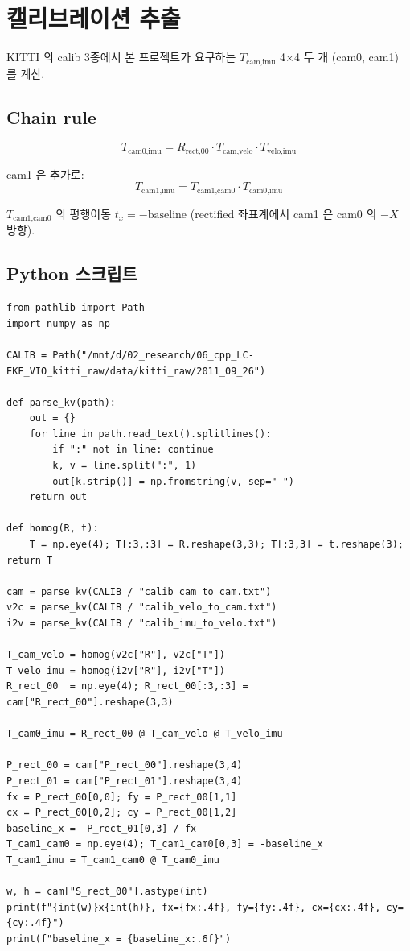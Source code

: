 \documentclass[11pt,a4paper,oneside]{report}
\begin{document}
\section{캘리브레이션 추출}

KITTI 의 calib 3종에서 본 프로젝트가 요구하는 \(T_{\text{cam,imu}}\) 4$\times$4 두 개 (cam0, cam1) 를 계산.

\subsection{Chain rule}
\begin{equation}
T_{\text{cam0,imu}} = R_{\text{rect,00}} \cdot T_{\text{cam,velo}} \cdot T_{\text{velo,imu}}
\end{equation}

cam1 은 추가로:
\begin{equation}
T_{\text{cam1,imu}} = T_{\text{cam1,cam0}} \cdot T_{\text{cam0,imu}}
\end{equation}

\(T_{\text{cam1,cam0}}\) 의 평행이동 \(t_x = -\text{baseline}\) (rectified 좌표계에서 cam1 은 cam0 의 \(-X\) 방향).

\subsection{Python 스크립트}

\begin{lstlisting}[style=py,caption={임시 파일로 저장 후 1회 실행}]
from pathlib import Path
import numpy as np

CALIB = Path("/mnt/d/02_research/06_cpp_LC-EKF_VIO_kitti_raw/data/kitti_raw/2011_09_26")

def parse_kv(path):
    out = {}
    for line in path.read_text().splitlines():
        if ":" not in line: continue
        k, v = line.split(":", 1)
        out[k.strip()] = np.fromstring(v, sep=" ")
    return out

def homog(R, t):
    T = np.eye(4); T[:3,:3] = R.reshape(3,3); T[:3,3] = t.reshape(3); return T

cam = parse_kv(CALIB / "calib_cam_to_cam.txt")
v2c = parse_kv(CALIB / "calib_velo_to_cam.txt")
i2v = parse_kv(CALIB / "calib_imu_to_velo.txt")

T_cam_velo = homog(v2c["R"], v2c["T"])
T_velo_imu = homog(i2v["R"], i2v["T"])
R_rect_00  = np.eye(4); R_rect_00[:3,:3] = cam["R_rect_00"].reshape(3,3)

T_cam0_imu = R_rect_00 @ T_cam_velo @ T_velo_imu

P_rect_00 = cam["P_rect_00"].reshape(3,4)
P_rect_01 = cam["P_rect_01"].reshape(3,4)
fx = P_rect_00[0,0]; fy = P_rect_00[1,1]
cx = P_rect_00[0,2]; cy = P_rect_00[1,2]
baseline_x = -P_rect_01[0,3] / fx
T_cam1_cam0 = np.eye(4); T_cam1_cam0[0,3] = -baseline_x
T_cam1_imu = T_cam1_cam0 @ T_cam0_imu

w, h = cam["S_rect_00"].astype(int)
print(f"{int(w)}x{int(h)}, fx={fx:.4f}, fy={fy:.4f}, cx={cx:.4f}, cy={cy:.4f}")
print(f"baseline_x = {baseline_x:.6f}")
\end{lstlisting}
\end{document}
